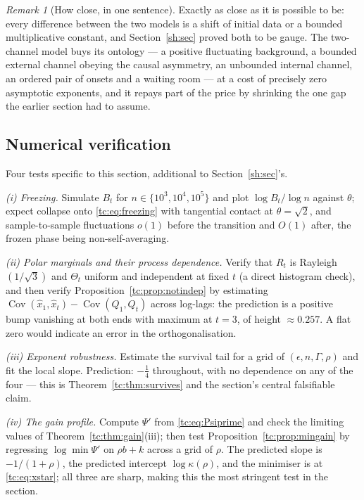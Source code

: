 \documentclass[11pt]{article}
\numberwithin{equation}{section}
\theoremstyle{plain}
\theoremstyle{definition}
\theoremstyle{remark}
\newtheorem{remark}[theorem]{Remark}
\DeclareMathOperator{\Cov}{Cov}
\begin{document}
\begin{remark}[How close, in one sentence]\label{tc:rem:howclose}
Exactly as close as it is possible to be: every difference between the
two models is a shift of initial data or a bounded multiplicative
constant, and Section~\ref{sh:sec} proved both to be gauge. The two-channel model
buys its ontology --- a positive fluctuating background, a bounded
external channel obeying the causal asymmetry, an unbounded internal
channel, an ordered pair of onsets and a waiting room --- at a cost of
precisely zero asymptotic exponents, and it repays part of the price by
shrinking the one gap the earlier section had to assume.
\end{remark}

\subsection{Numerical verification}\label{tc:sub:numerics}

Four tests specific to this section, additional to Section~\ref{sh:sec}'s.

\emph{(i) Freezing.} Simulate $B_t$ for $n\in\{10^{3},10^{4},10^{5}\}$
and plot $\log B_t/\log n$ against $\theta$; expect collapse onto
\eqref{tc:eq:freezing} with tangential contact at $\theta=\sqrt2$, and
sample-to-sample fluctuations $o(1)$ before the transition and $O(1)$
after, the frozen phase being non-self-averaging.

\emph{(ii) Polar marginals and their process dependence.} Verify that
$R_t$ is Rayleigh$(1/\sqrt3)$ and $\Theta_t$ uniform and independent at
fixed $t$ (a direct histogram check), and then verify
Proposition~\ref{tc:prop:notindep} by estimating
$\Cov(\hat x_1,\hat x_t)-\Cov(Q_1,Q_t)$ across log-lags: the prediction
is a positive bump vanishing at both ends with maximum at $t=3$, of
height $\approx0.257$. A flat zero would indicate an error in the
orthogonalisation.

\emph{(iii) Exponent robustness.} Estimate the survival tail for a grid
of $(\epsilon,n,\Gamma,\rho)$ and fit the local slope. Prediction:
$-\tfrac14$ throughout, with no dependence on any of the four ---
this is Theorem~\ref{tc:thm:survives} and the section's central
falsifiable claim.

\emph{(iv) The gain profile.} Compute $\Psi'$ from
\eqref{tc:eq:Psiprime} and check the limiting values of
Theorem~\ref{tc:thm:gain}(iii); then test
Proposition~\ref{tc:prop:mingain} by regressing $\log\min\Psi'$ on
$\rho b+k$ across a grid of $\rho$. The predicted slope is
$-1/(1+\rho)$, the
predicted intercept $\log\kappa(\rho)$, and the minimiser is at
\eqref{tc:eq:xstar}; all three are sharp, making this the most stringent
test in the section.
\end{document}
